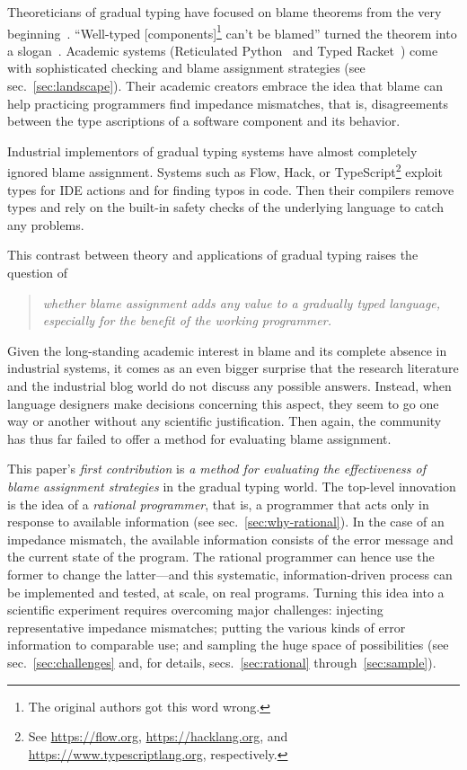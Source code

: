 
Theoreticians of gradual typing have focused on blame theorems from the
very beginning~\citep{mf-toplas-2009, tf-dls-2006}. ``Well-typed
[components]\footnote{The original authors got this word wrong.} can't be
blamed'' turned the theorem into a slogan~\citep{wf-esop-2009}. Academic
systems (Reticulated Python~\citep{vsc-dls-2019, vss-popl-2017,
vksb-dls-2014} and Typed
Racket~\citep{tf-dls-2006,tf-popl-2008,tfffgksst-snapl-2017,tf-icfp-2010})
come with sophisticated checking and blame assignment strategies (see
sec.~\ref{sec:landscape}). Their academic creators embrace the idea that
blame can help practicing programmers find impedance mismatches, that is,
disagreements between the type ascriptions of a software component and its
behavior.

Industrial implementors of gradual typing systems have almost
completely ignored blame assignment.  Systems such as Flow, Hack, or
TypeScript\footnote{See \url{https://flow.org},
\url{https://hacklang.org}, and \url{https://www.typescriptlang.org},
respectively.} exploit types for IDE actions and for finding typos in
code. Then their compilers remove types and rely on the built-in
safety checks of the underlying language to catch any problems.

This contrast between theory and applications of gradual typing raises the question of
\begin{quote}
 \it
 whether blame assignment adds any value to a gradually typed language,
 especially for the benefit of the working programmer.
\end{quote}
Given the long-standing academic interest in blame and its complete absence in
industrial systems, it comes as an even bigger surprise that the research
literature and the industrial blog world do not discuss any possible answers.
Instead, when language designers make decisions concerning this aspect, they seem
to go one way or another without any scientific justification. Then again, the
community has thus far failed to offer a method for evaluating blame assignment.

This paper's {\em first contribution\/} is {\em a method for evaluating the
effectiveness of blame assignment strategies\/} in the gradual typing world.
The top-level innovation is the idea of a {\em rational programmer\/}, that is,
a programmer that acts only in response to available information (see
sec.~\ref{sec:why-rational}). In the case of an impedance mismatch, the
available information consists of the error message and the current state of the
program. The rational programmer can hence use the former to change the
latter---and this systematic, information-driven process can be implemented and
tested, at scale, on real programs.  Turning this idea into a scientific
experiment requires overcoming major challenges: injecting representative
impedance mismatches; putting the various kinds of error information to
comparable use; and sampling the huge space of possibilities (see
sec.~\ref{sec:challenges} and, for details, secs.~\ref{sec:rational} through~\ref{sec:sample}).

